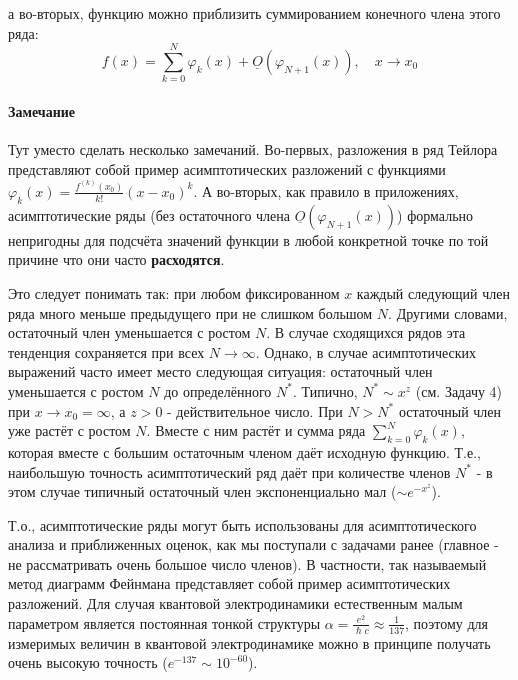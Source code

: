 \documentclass[a4paper,12pt]{article}
\begin{document}
\noindent
а во-вторых, функцию можно приблизить суммированием конечного члена
этого ряда:
\[
f(x)=\sum_{k=0}^{N}\varphi_{k}(x)+\underline{O}(\varphi_{N+1}(x)),\quad x\to x_{0}
\]



\paragraph{Замечание}

Тут уместо сделать несколько замечаний. Во-первых, разложения в ряд
Тейлора представляют собой пример асимптотических разложений с функциями
$\varphi_{k}(x)=\frac{f^{(k)}(x_{0})}{k!}(x-x_{0})^{k}$. А во-вторых,
как правило в приложениях, асимптотические ряды (без остаточного члена $\underline{O}(\varphi_{N+1}(x))$) формально непригодны
для подсчёта значений функции в любой конкретной точке по той причине что они часто \textbf{расходятся}. 

\vspace{5mm}
\noindent
Это следует понимать так: при любом фиксированном $x$ каждый следующий член ряда много меньше предыдущего при не слишком большом $N$. Другими словами, остаточный член уменьшается с ростом $N$. В случае сходящихся рядов эта тенденция сохраняется при всех $N\to\infty$. Однако, в случае асимптотических выражений часто имеет место следующая ситуация: остаточный член уменьшается с ростом $N$ до определённого $N^{*}$. Типично, $N^{*}\sim x^z$ (см. Задачу 4) при $x\to x_0=\infty$, а $z>0$ - действительное число. При $N>N^{*}$ остаточный член уже растёт с ростом $N$. Вместе с ним растёт и сумма ряда $\sum_{k=0}^{N}\varphi_{k}(x)$, которая вместе с большим остаточным членом даёт исходную функцию. Т.е., наибольшую точность асимптотический ряд даёт при количестве членов $N^{*}$ - в этом случае типичный остаточный член экспоненциально мал ($\sim e^{-x^z}$).

\vspace{5mm}
\noindent
Т.о., асимптотические ряды могут быть использованы для асимптотического анализа и приближенных оценок, как
мы поступали с задачами ранее (главное - не рассматривать очень большое число членов). В частности, так называемый метод диаграмм Фейнмана представляет собой пример асимптотических разложений. Для случая квантовой электродинамики естественным малым параметром является постоянная тонкой структуры $\alpha=\frac{e^2}{\hslash c}\approx\frac{1}{137}$, поэтому для измеримых величин в квантовой электродинамике можно в принципе получать очень высокую точность ($e^{-137}\sim10^{-60}$).
\end{document}
